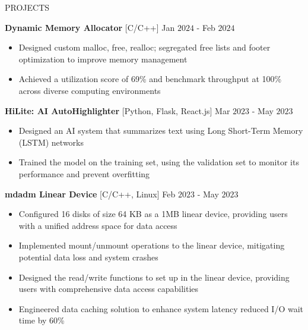 \documentclass{resume} %
\begin{document}
\begin{rSection}{PROJECTS}

{\bf Dynamic Memory Allocator }{[C/C++] } \hfill Jan $2024$ - Feb $2024$
\begin{itemize}[itemsep = -4pt]
    \item Designed custom malloc, free, realloc; segregated free lists and footer optimization to improve memory management
    \item Achieved a utilization score of 69\% and benchmark throughput at 100\% across diverse computing environments
\end{itemize}

{\bf HiLite: AI AutoHighlighter }{[Python, Flask, React.js] } \hfill Mar $2023$ - May $2023$
\begin{itemize}[itemsep = -4pt]
    \item Designed an AI system that summarizes text using Long Short-Term Memory (LSTM) networks
    \item Trained the model on the training set, using the validation set to monitor its performance and prevent overfitting
\end{itemize}

{\bf mdadm Linear Device }{[C/C++, Linux] } \hfill Feb $2023$ - May $2023$
\begin{itemize}[itemsep = -4pt]
    \item Configured 16 disks of size 64 KB as a 1MB linear device, providing users with a unified address space for data access
    \item Implemented mount/unmount operations to the linear device, mitigating potential data loss and system crashes
    \item Designed the read/write functions to set up in the linear device, providing users with comprehensive data access capabilities
    \item Engineered data caching solution to enhance system latency reduced I/O wait time by 60\%
\end{itemize}

\end{rSection}
\end{document}
